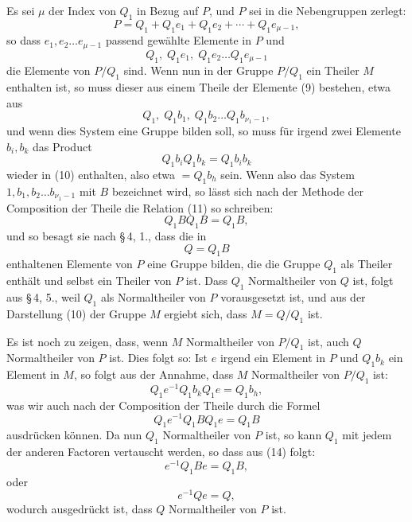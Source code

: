 \documentclass[11pt]{article}
\begin{document}
Es sei $\mu$ der Index von $Q_1$ in Bezug auf $P$, und $P$ sei in die Nebengruppen zerlegt:
\begin{equation}
P=Q_1+Q_1e_1+Q_1e_2+\cdots+Q_1e_{\mu-1},
\tag{8}
\end{equation}
so dass $e_1,e_2\ldots e_{\mu-1}$ passend gewählte Elemente in $P$ und
\begin{equation}
Q_1,\;Q_1e_1,\;Q_1e_2\ldots Q_1e_{\mu-1}
\tag{9}
\end{equation}
die Elemente von $P/Q_1$ sind. Wenn nun in der Gruppe $P/Q_1$ ein Theiler $M$ enthalten ist, so muss dieser aus einem Theile der Elemente (9) bestehen, etwa aus
\begin{equation}
Q_1,\;Q_1b_1,\;Q_1b_2\ldots Q_1b_{\nu_1-1},
\tag{10}
\end{equation}
und wenn dies System eine Gruppe bilden soll, so muss für irgend zwei Elemente $b_i,b_k$ das Product
\begin{equation}
Q_1b_iQ_1b_k=Q_1b_ib_k
\tag{11}
\end{equation}
wieder in (10) enthalten, also etwa $=Q_1b_h$ sein. Wenn also das System $1,b_1,b_2\ldots b_{\nu_1-1}$ mit $B$ bezeichnet wird, so lässt sich nach der Methode der Composition der Theile die Relation (11) so schreiben:
\begin{equation}
Q_1BQ_1B=Q_1B,
\tag{12}
\end{equation}
und so besagt sie nach \S\,4, 1., dass die in
\begin{equation}
Q=Q_1B
\tag{13}
\end{equation}
enthaltenen Elemente von $P$ eine Gruppe bilden, die die Gruppe $Q_1$ als Theiler enthält und selbst ein Theiler von $P$ ist. Dass $Q_1$ Normaltheiler von $Q$ ist, folgt aus \S\,4, 5., weil $Q_1$ als Normaltheiler von $P$ vorausgesetzt ist, und aus der Darstellung (10) der Gruppe $M$ ergiebt sich, dass $M=Q/Q_1$ ist.

Es ist noch zu zeigen, dass, wenn $M$ Normaltheiler von $P/Q_1$ ist, auch $Q$ Normaltheiler von $P$ ist. Dies folgt so: Ist $e$ irgend ein Element in $P$ und $Q_1b_k$ ein Element in $M$, so folgt aus der Annahme, dass $M$ Normaltheiler von $P/Q_1$ ist:
\[
Q_1e^{-1}Q_1b_kQ_1e=Q_1b_h,
\]
was wir auch nach der Composition der Theile durch die Formel
\begin{equation}
Q_1e^{-1}Q_1BQ_1e=Q_1B
\tag{14}
\end{equation}
ausdrücken können. Da nun $Q_1$ Normaltheiler von $P$ ist, so kann $Q_1$ mit jedem der anderen Factoren vertauscht werden, so dass aus (14) folgt:
\[
e^{-1}Q_1Be=Q_1B,
\]
oder
\begin{equation}
e^{-1}Qe=Q,
\tag{15}
\end{equation}
wodurch ausgedrückt ist, dass $Q$ Normaltheiler von $P$ ist.
\end{document}
